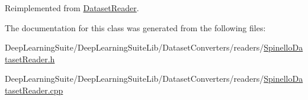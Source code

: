 Reimplemented from \hyperlink{class_dataset_reader_a732438244cec7c20294f93c6b635888c}{Dataset\+Reader}.



The documentation for this class was generated from the following files\+:\begin{DoxyCompactItemize}
\item 
Deep\+Learning\+Suite/\+Deep\+Learning\+Suite\+Lib/\+Dataset\+Converters/readers/\hyperlink{_spinello_dataset_reader_8h}{Spinello\+Dataset\+Reader.\+h}\item 
Deep\+Learning\+Suite/\+Deep\+Learning\+Suite\+Lib/\+Dataset\+Converters/readers/\hyperlink{_spinello_dataset_reader_8cpp}{Spinello\+Dataset\+Reader.\+cpp}\end{DoxyCompactItemize}
